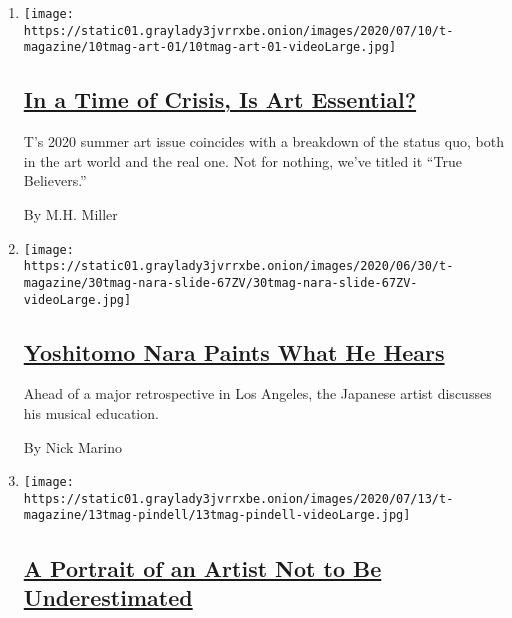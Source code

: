 \begin{enumerate}
\def\labelenumi{\arabic{enumi}.}
\item
  \texttt{[image: https://static01.graylady3jvrrxbe.onion/images/2020/07/10/t-magazine/10tmag-art-01/10tmag-art-01-videoLarge.jpg]}

  \hypertarget{in-a-time-of-crisis-is-art-essential}{%
  \subsection{\texorpdfstring{\href{/2020/07/20/t-magazine/museums-galleries-open-art.html}{In
  a Time of Crisis, Is Art
  Essential?}}{In a Time of Crisis, Is Art Essential?}}\label{in-a-time-of-crisis-is-art-essential}}

  T's 2020 summer art issue coincides with a breakdown of the status
  quo, both in the art world and the real one. Not for nothing, we've
  titled it ``True Believers.''

  By M.H. Miller
\item
  \texttt{[image: https://static01.graylady3jvrrxbe.onion/images/2020/06/30/t-magazine/30tmag-nara-slide-67ZV/30tmag-nara-slide-67ZV-videoLarge.jpg]}

  \hypertarget{yoshitomo-nara-paints-what-he-hears-1}{%
  \subsection{\texorpdfstring{\href{/2020/07/24/t-magazine/yoshitomo-nara.html}{Yoshitomo
  Nara Paints What He
  Hears}}{Yoshitomo Nara Paints What He Hears}}\label{yoshitomo-nara-paints-what-he-hears-1}}

  Ahead of a major retrospective in Los Angeles, the Japanese artist
  discusses his musical education.

  By Nick Marino
\item
  \texttt{[image: https://static01.graylady3jvrrxbe.onion/images/2020/07/13/t-magazine/13tmag-pindell/13tmag-pindell-videoLarge.jpg]}

  \hypertarget{a-portrait-of-an-artist-not-to-be-underestimated-1}{%
  \subsection{\texorpdfstring{\href{/2020/07/24/t-magazine/howardena-pindell.html}{A
  Portrait of an Artist Not to Be
  Underestimated}}{A Portrait of an Artist Not to Be Underestimated}}\label{a-portrait-of-an-artist-not-to-be-underestimated-1}}


\end{enumerate}

